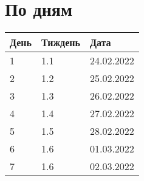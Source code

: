  
 
 
 
 

\section{По дням}
\label{sec:topics.vojna.dni}

\hypertarget{sec:topics.vojna.dni}{}

\begin{longtable}{|l|l|l|}
  
\hline
День & Тиждень & Дата \\ \hline

1 & 1.1 & 24.02.2022 \\
2 & 1.2 & 25.02.2022 \\
3 & 1.3 & 26.02.2022 \\
4 & 1.4 & 27.02.2022 \\
5 & 1.5 & 28.02.2022 \\
6 & 1.6 & 01.03.2022 \\
7 & 1.6 & 02.03.2022 \\

\hline


\end{longtable}
